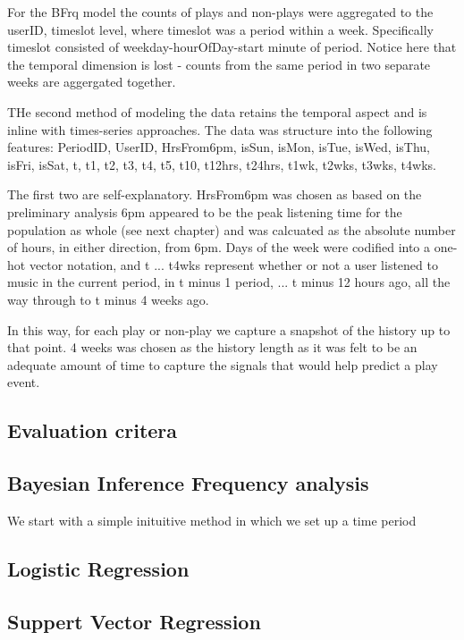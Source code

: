 For the BFrq model the counts of plays and non-plays were aggregated to the userID, timeslot level, where timeslot was a period within a week. Specifically timeslot consisted of weekday-hourOfDay-start minute of period. Notice here that the temporal dimension is lost - counts from the same period in two separate weeks are aggergated together. 

THe second method of modeling the data retains the temporal aspect and is inline with times-series approaches. The data was structure into the following features: PeriodID, UserID, HrsFrom6pm, isSun, isMon, isTue, isWed, isThu, isFri, isSat, t, t1, t2, t3, t4, t5, t10, t12hrs, t24hrs, t1wk, t2wks, t3wks, t4wks.

The first two are self-explanatory. HrsFrom6pm was chosen as based on the preliminary analysis 6pm appeared to be the peak listening time for the population as whole (see next chapter) and was calcuated as the absolute number of hours, in either direction, from 6pm. Days of the week were codified into a one-hot vector notation, and t ... t4wks represent whether or not a user listened to music in the current period, in t minus 1 period, ... t minus 12 hours ago, all the way through to t minus 4 weeks ago.

In this way, for each play or non-play we capture a snapshot of the history up to that point. 4 weeks was chosen as the history length as it was felt to be an adequate amount of time to capture the signals that would help predict a play event.

 
\subsection{Evaluation critera}

\subsection{Bayesian Inference Frequency analysis}

We start with a simple inituitive method in which we set up a time period
\subsection{Logistic Regression}

\subsection{Suppert Vector Regression}

